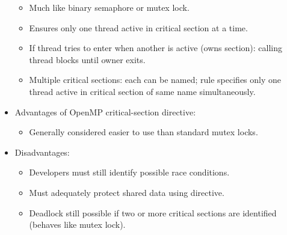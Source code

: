 \begin{itemize}
\begin{itemize}
        \item Much like binary semaphore or mutex lock.
        \item Ensures only one thread active in critical section at a time.
        \item If thread tries to enter when another is active (owns section): calling thread blocks until owner exits.
        \item Multiple critical sections: each can be named; rule specifies only one thread active in critical section of same name simultaneously.
    \end{itemize}
    \item Advantages of OpenMP critical-section directive:
    \begin{itemize}
        \item Generally considered easier to use than standard mutex locks.
    \end{itemize}
    \item Disadvantages:
    \begin{itemize}
        \item Developers must still identify possible race conditions.
        \item Must adequately protect shared data using directive.
        \item Deadlock still possible if two or more critical sections are identified (behaves like mutex lock).
    \end{itemize}
\end{itemize}

